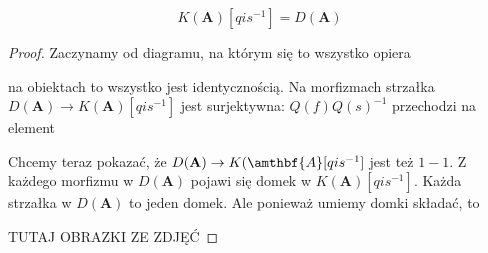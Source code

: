 \begin{fact}
  $$K(\mathbf{A})[qis^{-1}]=D(\mathbf{A})$$
\end{fact}

\begin{proof}
  Zaczynamy od diagramu, na którym się to wszystko opiera 
  \begin{center}\end{center}
  na obiektach to wszystko jest identycznością. Na morfizmach strzałka $D(\mathbf{A})\to K(\mathbf{A})[qis^{-1}]$ jest surjektywna: $Q(f)Q(s)^{-1}$ przechodzi na element
  \begin{center}\end{center} 
  Chcemy teraz pokazać, że $D(\mathbf{A})\to K(\amthbf{A}[qis^{-1}]$ jest też $1-1$. Z każdego morfizmu w $D(\mathbf{A})$ pojawi się domek w $K(\mathbf{A})[qis^{-1}]$. Każda strzałka w $D(\mathbf{A})$ to jeden domek. Ale ponieważ umiemy domki składać, to 
  \begin{center}\end{center}
  {\large\color{red}TUTAJ OBRAZKI ZE ZDJĘĆ}


\end{proof}
